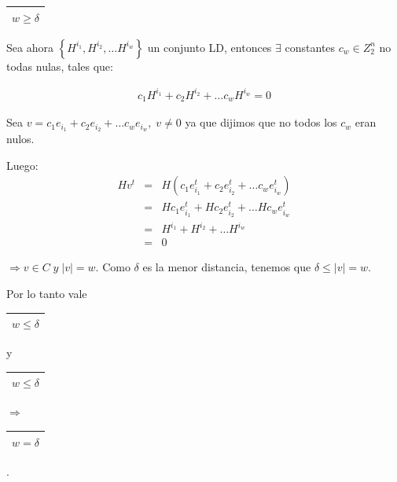 \documentclass[12pt,a4paper]{report}
\newcounter{neq}
\begin{document}
  			\vspace{3mm}
  			\begin{tabular}{|c|} \hline $w \geq \delta $ \\\hline \end{tabular}
  			\vspace{3mm}
  			\par Sea ahora $\left\lbrace H^{i_{1}}, H^{i_{2}}, \dotsc H^{i_{w}} \right\rbrace$ un conjunto LD, entonces $\exists$ constantes $c_{w} \in Z_{2}^{n}$ no todas nulas, tales que:

  			\begin{eqnarray}
  				\nonumber c_{1} H^{i_{1}} + c_{2} H^{i_{2}} + \dotsc c_{w} H^{i_{w}} = 0
  			\end{eqnarray}

  			\par Sea $v = c_{1} e_{i_{1}} + c_{2} e_{i_{2}} + \dotsc c_{w} e_{i_{w}} , \; v \neq 0$ ya que dijimos que no todos los $c_{w}$ eran nulos.

  			\vspace{3mm}
  			\par Luego:
  			\begin{eqnarray}
  				\nonumber H v^{t} &=& H (c_{1} e_{i_{1}}^{t} + c_{2} e_{i_{2}}^{t} + \dotsc c_{w} e_{i_{w}}^{t}) \\
  				\nonumber &=& H c_{1} e_{i_{1}}^{t} + H c_{2} e_{i_{2}}^{t} + \dotsc H c_{w} e_{i_{w}}^{t} \\
  				\nonumber &=& H^{i_{1}} + H^{i_{2}} + \dotsc H^{i_{w}} \\
  				\nonumber &=& 0
  			\end{eqnarray}
  			\par $\Rightarrow v \in C \; y \; \lvert v \rvert = w$. Como $\delta$ es la menor distancia, tenemos que $\delta \leq \lvert v \rvert = w$.

  			\vspace{5mm}
  			\par Por lo tanto vale \begin{tabular}{|c|} \hline $w \leq \delta $ \\ \hline \end{tabular} y \begin{tabular}{|c|} \hline $w \leq \delta $ \\ \hline \end{tabular} $\Rightarrow$ \begin{tabular}{|c|} \hline $w = \delta $ \\ \hline \end{tabular}.
\end{document}
